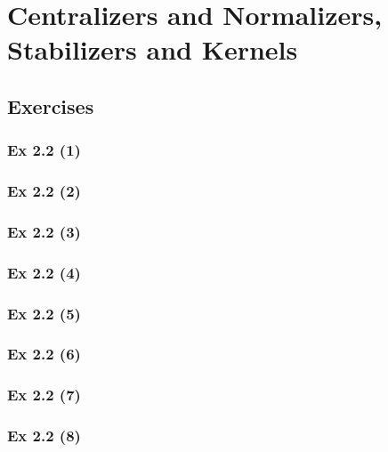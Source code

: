 \newpage		%

\section{Centralizers and Normalizers, Stabilizers and Kernels}\label{sec:2.2}
\subsection*{Exercises}\label{sec:2.2_Exercises}

\subsubsection{Ex 2.2 (1)}\label{sec:Ex_2.2.1}

\subsubsection{Ex 2.2 (2)}\label{sec:Ex_2.2.2}

\subsubsection{Ex 2.2 (3)}\label{sec:Ex_2.2.3}

\subsubsection{Ex 2.2 (4)}\label{sec:Ex_2.2.4}

\subsubsection{Ex 2.2 (5)}\label{sec:Ex_2.2.5}

\subsubsection{Ex 2.2 (6)}\label{sec:Ex_2.2.6}

\subsubsection{Ex 2.2 (7)}\label{sec:Ex_2.2.7}

\subsubsection{Ex 2.2 (8)}\label{sec:Ex_2.2.8}

